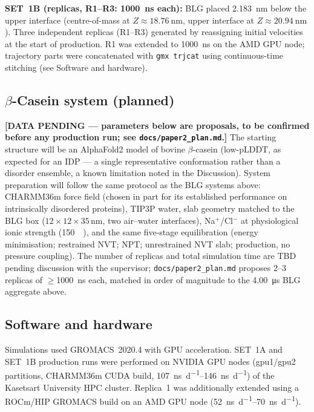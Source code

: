 \documentclass[11pt,a4paper]{article}
\begin{document}
\textbf{SET~1B (replicas, R1--R3: \SI{1000}{\nano\second} each):}
BLG placed \SI{2.183}{\nano\metre} below the upper interface
(centre-of-mass at $Z \approx \SI{18.76}{\nano\metre}$, upper interface
at $Z \approx \SI{20.94}{\nano\metre}$). Three independent replicas
(R1--R3) generated by reassigning initial velocities at the start of
production. R1 was extended to \SI{1000}{\nano\second} on the AMD GPU node;
trajectory parts were concatenated with \texttt{gmx trjcat} using
continuous-time stitching (see Software and hardware).

\subsection*{$\beta$-Casein system (planned)}

\textbf{[DATA PENDING --- parameters below are proposals, to be confirmed
before any production run; see \texttt{docs/paper2\_plan.md}.]} The
starting structure will be an AlphaFold2 model of bovine $\beta$-casein
(low-pLDDT, as expected for an IDP --- a single representative
conformation rather than a disorder ensemble, a known limitation noted
in the Discussion). System preparation will follow the same protocol as
the BLG systems above: CHARMM36m force field (chosen in part for its
established performance on intrinsically disordered
proteins\citep{Huang2017}), TIP3P water, slab geometry matched to the
BLG box ($12\times12\times35\,\si{\nano\metre}$, two air--water
interfaces), Na$^+$/Cl$^-$ at physiological ionic strength
(\SI{150}{\milli\Molar}), and the same five-stage equilibration (energy
minimisation; restrained NVT; NPT; unrestrained NVT slab; production,
no pressure coupling). The number of replicas and total simulation time
are TBD pending discussion with the supervisor; \texttt{docs/paper2\_plan.md}
proposes \num{2}--\num{3} replicas of $\geq$\SI{1000}{\nano\second} each,
matched in order of magnitude to the \SI{4.00}{\micro\second} BLG
aggregate above.

\subsection*{Software and hardware}

Simulations used GROMACS~2020.4\citep{Abraham2015} with GPU acceleration.
SET~1A and SET~1B production runs were performed on NVIDIA GPU
nodes (gpu1/gpu2 partitions, CHARMM36m CUDA build,
\SIrange{107}{146}{\nano\second\per\day}) of the Kasetsart University
HPC cluster. Replica~1 was additionally extended using a ROCm/HIP GROMACS
build on an AMD GPU node (\SIrange{52}{70}{\nano\second\per\day}).
\end{document}
